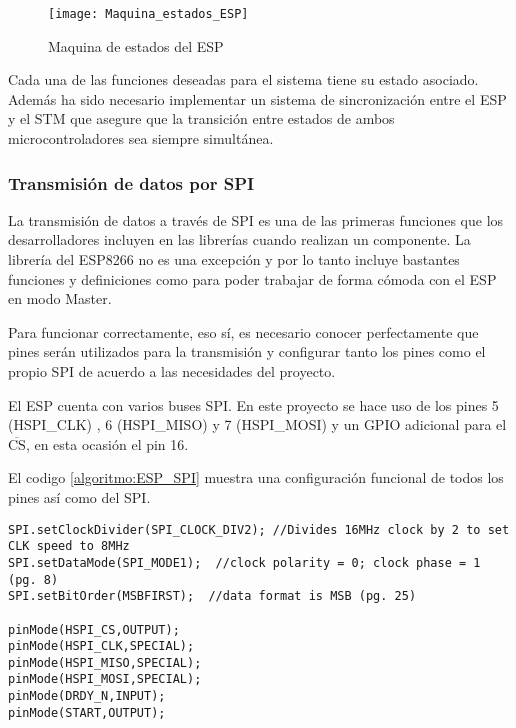 \begin{figure} [h]
    \centering
    \texttt{[image: Maquina\_estados\_ESP]}
    \caption{Maquina de estados del ESP}
    \label{fig:Maquina_estados_ESP}
\end{figure}

Cada una de las funciones deseadas para el sistema tiene su estado asociado. Además ha sido necesario implementar un sistema de sincronización entre el ESP y el STM que asegure que la transición entre estados de ambos microcontroladores sea siempre simultánea.

\clearpage

\subsubsection{Transmisión de datos por SPI\label{sec:Software_Arduino_Com}}

La transmisión de datos a través de SPI es una de las primeras funciones que los desarrolladores incluyen en las librerías cuando realizan un componente. La librería del ESP8266 no es una excepción y por lo tanto incluye bastantes funciones y definiciones como para poder trabajar de forma cómoda con el ESP en modo Master.

Para funcionar correctamente, eso sí, es necesario conocer perfectamente que pines serán utilizados para la transmisión y configurar tanto los pines como el propio SPI de acuerdo a las necesidades del proyecto.

El ESP cuenta con varios buses SPI. En este proyecto se hace uso de los pines 5 (HSPI\_CLK) , 6 (HSPI\_MISO) y 7 (HSPI\_MOSI) y un GPIO adicional para el $\overline{\text{CS}}$, en esta ocasión el pin 16.

El codigo \ref{algoritmo:ESP_SPI} muestra una configuración funcional de todos los pines así como del SPI.

\begin{lstlisting}[label=algoritmo:ESP_SPI,style = STM-code,frame=single,caption=Configuración de pines para el uso de SPI]
SPI.setClockDivider(SPI_CLOCK_DIV2); //Divides 16MHz clock by 2 to set CLK speed to 8MHz
SPI.setDataMode(SPI_MODE1);  //clock polarity = 0; clock phase = 1 (pg. 8)
SPI.setBitOrder(MSBFIRST);  //data format is MSB (pg. 25)  
  
pinMode(HSPI_CS,OUTPUT);
pinMode(HSPI_CLK,SPECIAL);
pinMode(HSPI_MISO,SPECIAL);
pinMode(HSPI_MOSI,SPECIAL);
pinMode(DRDY_N,INPUT);
pinMode(START,OUTPUT);
\end{lstlisting}

